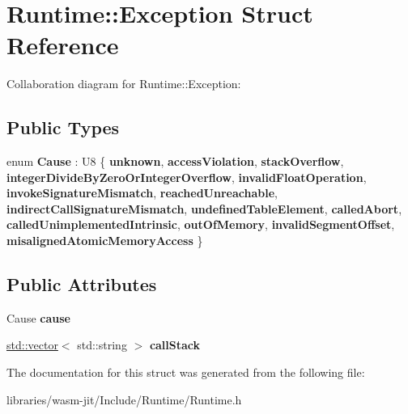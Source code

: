 \hypertarget{struct_runtime_1_1_exception}{}\section{Runtime\+:\+:Exception Struct Reference}
\label{struct_runtime_1_1_exception}


Collaboration diagram for Runtime\+:\+:Exception\+:
\subsection*{Public Types}
\begin{DoxyCompactItemize}
\item 
\mbox{\label{struct_runtime_1_1_exception_afc8ac3bfe94580f2f2e8a8c0945de59c}} 
enum {\bfseries Cause} \+: U8 \{ \newline
{\bfseries unknown}, 
{\bfseries access\+Violation}, 
{\bfseries stack\+Overflow}, 
{\bfseries integer\+Divide\+By\+Zero\+Or\+Integer\+Overflow}, 
\newline
{\bfseries invalid\+Float\+Operation}, 
{\bfseries invoke\+Signature\+Mismatch}, 
{\bfseries reached\+Unreachable}, 
{\bfseries indirect\+Call\+Signature\+Mismatch}, 
\newline
{\bfseries undefined\+Table\+Element}, 
{\bfseries called\+Abort}, 
{\bfseries called\+Unimplemented\+Intrinsic}, 
{\bfseries out\+Of\+Memory}, 
\newline
{\bfseries invalid\+Segment\+Offset}, 
{\bfseries misaligned\+Atomic\+Memory\+Access}
 \}
\end{DoxyCompactItemize}
\subsection*{Public Attributes}
\begin{DoxyCompactItemize}
\item 
\mbox{\label{struct_runtime_1_1_exception_a6d61df6a78e253a562af1fdbd19e1659}} 
Cause {\bfseries cause}
\item 
\mbox{\label{struct_runtime_1_1_exception_a4d5476f70e524b4ee1aae1ea85c738c2}} 
\mbox{\hyperlink{classstd_1_1vector}{std\+::vector}}$<$ std\+::string $>$ {\bfseries call\+Stack}
\end{DoxyCompactItemize}


The documentation for this struct was generated from the following file\+:\begin{DoxyCompactItemize}
\item 
libraries/wasm-\/jit/\+Include/\+Runtime/Runtime.\+h\end{DoxyCompactItemize}
